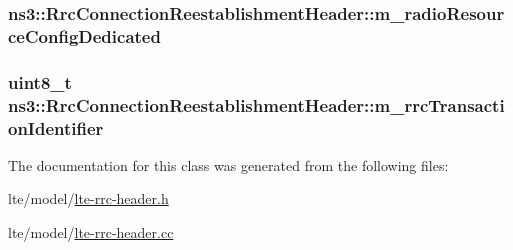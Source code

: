 \subsubsection[{\texorpdfstring{m\+\_\+radio\+Resource\+Config\+Dedicated}{m_radioResourceConfigDedicated}}]{ ns3\+::\+Rrc\+Connection\+Reestablishment\+Header\+::m\+\_\+radio\+Resource\+Config\+Dedicated\hspace{0.3cm}{\ttfamily [private]}}\hypertarget{classns3_1_1RrcConnectionReestablishmentHeader_a0e59f072a5c743c2f72869a0ae941130}{}\label{classns3_1_1RrcConnectionReestablishmentHeader_a0e59f072a5c743c2f72869a0ae941130}
\subsubsection[{\texorpdfstring{m\+\_\+rrc\+Transaction\+Identifier}{m_rrcTransactionIdentifier}}]{\setlength{\rightskip}{0pt plus 5cm}uint8\+\_\+t ns3\+::\+Rrc\+Connection\+Reestablishment\+Header\+::m\+\_\+rrc\+Transaction\+Identifier\hspace{0.3cm}{\ttfamily [private]}}\hypertarget{classns3_1_1RrcConnectionReestablishmentHeader_a0076e23c53a65fe3c18a95c6d4d007c7}{}\label{classns3_1_1RrcConnectionReestablishmentHeader_a0076e23c53a65fe3c18a95c6d4d007c7}


The documentation for this class was generated from the following files\+:\begin{DoxyCompactItemize}
\item 
lte/model/\hyperlink{lte-rrc-header_8h}{lte-\/rrc-\/header.\+h}\item 
lte/model/\hyperlink{lte-rrc-header_8cc}{lte-\/rrc-\/header.\+cc}\end{DoxyCompactItemize}
